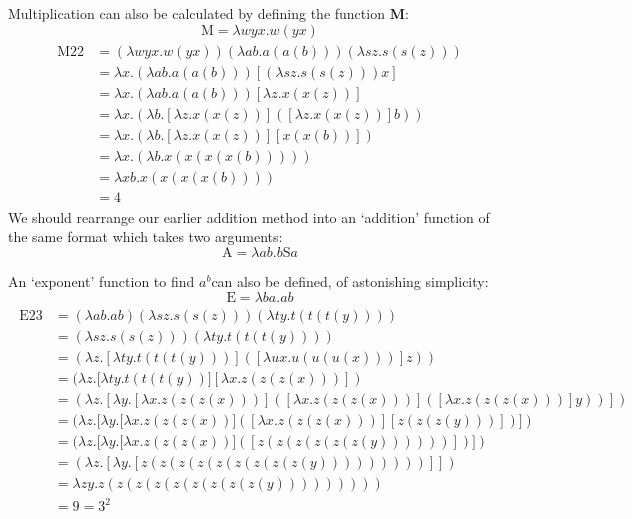 \documentclass[Master.tex]{subfiles}
\begin{document}
Multiplication can also be calculated by defining the function \textbf{M}:
\cite{rojas2015lambdatutorial}
\begin{equation*}
\bm{\mathrm{M}} = \lambda wyx.w(yx)
\end{equation*}
\begin{gather*}
\begin{aligned}
\bm{\mathrm{M22}} &= (\lambda wyx.w(yx))(\lambda ab.a(a(b)))(\lambda sz.s(s(z)))\\
&= \lambda x.(\lambda ab.a(a(b)))[(\lambda sz.s(s(z)))x]\\
&= \lambda x.(\lambda ab.a(a(b)))[\lambda z.x(x(z))]\\
&= \lambda x.(\lambda b.[\lambda z.x(x(z))]([\lambda z.x(x(z))]b))\\
&= \lambda x.(\lambda b.[\lambda z.x(x(z))][x(x(b))])\\
&= \lambda x.(\lambda b.x(x(x(x(b)))))\\
&= \lambda xb.x(x(x(x(b))))\\
&= \bm{\mathrm{4}}
\end{aligned}
\end{gather*}
We should rearrange our earlier addition method into an `addition' function of the same format which takes two arguments:
\begin{equation*}
\bm{\mathrm{A}} = \lambda ab.b\bm{\mathrm{S}}a
\end{equation*}

An `exponent' function to find $a^b$can also be defined, of astonishing simplicity:
\cite{penrose1991emperor}
\begin{equation*}
\bm{\mathrm{E}} = \lambda ba.ab
\end{equation*}
\begin{gather*}
\begin{aligned}
\bm{\mathrm{E23}} &= (\lambda ab.ab)(\lambda sz.s(s(z)))(\lambda ty.t(t(t(y))))\\
&= (\lambda sz.s(s(z)))(\lambda ty.t(t(t(y))))\\
&= (\lambda z.[\lambda ty.t(t(t(y)))]([\lambda ux.u(u(u(x)))]z))\\
&= (\lambda z.[\lambda ty.t(t(t(y))][\lambda x.z(z(z(x)))])\\
&= (\lambda z.[\lambda y.[\lambda x.z(z(z(x)))]([\lambda x.z(z(z(x)))]([\lambda x.z(z(z(x)))]y))])\\
&= (\lambda z.[\lambda y.[\lambda x.z(z(z(x))]([\lambda x.z(z(z(x)))][z(z(z(y)))])])\\
&= (\lambda z.[\lambda y.[\lambda x.z(z(z(x))]([z(z(z(z(z(z(y))))))])])\\
&= (\lambda z.[\lambda y.[z(z(z(z(z(z(z(z(z(y)))))))))]])\\
&= \lambda zy.z(z(z(z(z(z(z(z(z(y)))))))))\\
&= \bm{\mathrm{9}} = \bm{\mathrm{3^2}}
\end{aligned}
\end{gather*}
\end{document}
